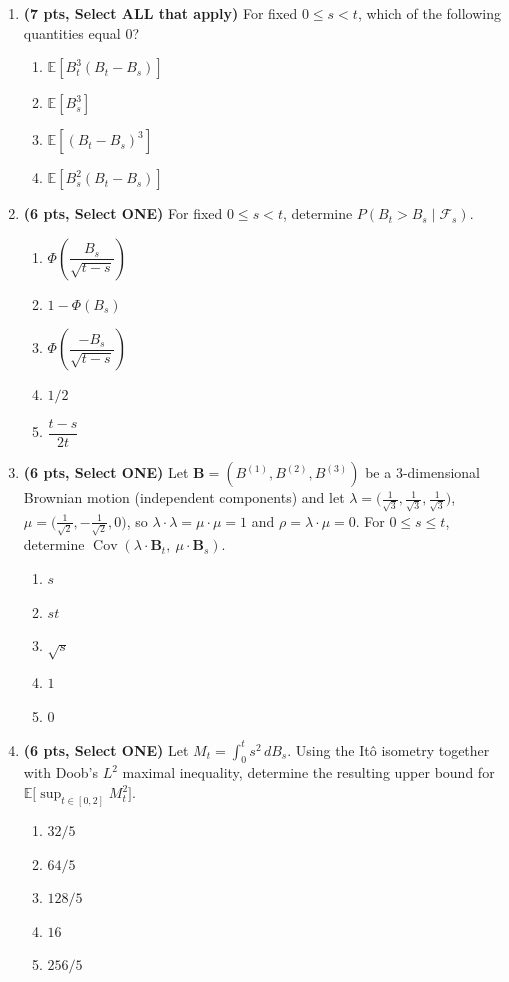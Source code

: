\documentclass[11pt]{article}
\newcommand{\E}{\mathbb{E}}
\DeclareMathOperator{\Cov}{Cov}
\begin{document}
\begin{enumerate}
\item[\textbf{Q9.}] \textbf{(7 pts, Select ALL that apply)} For fixed $0\le s<t$, which of the following quantities equal $0$?
\begin{enumerate}
  \item $\E[B_t^3(B_t-B_s)]$
  \item $\E[B_s^3]$
  \item $\E[(B_t-B_s)^3]$
  \item $\E[B_s^2(B_t-B_s)]$
\end{enumerate}

\item[\textbf{Q10.}] \textbf{(6 pts, Select ONE)} For fixed $0\le s<t$, determine $P(B_t>B_s\mid\mathcal F_s)$.
\begin{enumerate}
  \item $\Phi\!\left(\dfrac{B_s}{\sqrt{t-s}}\right)$
  \item $1-\Phi(B_s)$
  \item $\Phi\!\left(\dfrac{-B_s}{\sqrt{t-s}}\right)$
  \item $1/2$
  \item $\dfrac{t-s}{2t}$
\end{enumerate}

\item[\textbf{Q11.}] \textbf{(6 pts, Select ONE)} Let $\boldsymbol B=(B^{(1)},B^{(2)},B^{(3)})$ be a $3$-dimensional Brownian motion (independent components) and let $\lambda=\big(\tfrac1{\sqrt3},\tfrac1{\sqrt3},\tfrac1{\sqrt3}\big)$, $\mu=\big(\tfrac1{\sqrt2},-\tfrac1{\sqrt2},0\big)$, so $\lambda\cdot\lambda=\mu\cdot\mu=1$ and $\rho=\lambda\cdot\mu=0$. For $0\le s\le t$, determine $\Cov(\lambda\cdot\boldsymbol B_t,\ \mu\cdot\boldsymbol B_s)$.
\begin{enumerate}
  \item $s$
  \item $st$
  \item $\sqrt s$
  \item $1$
  \item $0$
\end{enumerate}

\item[\textbf{Q12.}] \textbf{(6 pts, Select ONE)} Let $M_t=\int_0^ts^2\,dB_s$. Using the It\^o isometry together with Doob's $L^2$ maximal inequality, determine the resulting upper bound for $\E\big[\sup_{t\in[0,2]}M_t^2\big]$.
\begin{enumerate}
  \item $32/5$
  \item $64/5$
  \item $128/5$
  \item $16$
  \item $256/5$
\end{enumerate}


\end{enumerate}
\end{document}
